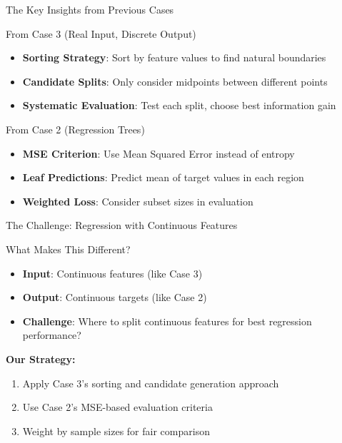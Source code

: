 \documentclass[usenames,dvipsnames]{beamer}
\begin{document}
\begin{frame}{The Key Insights from Previous Cases}
        \scriptsize

\begin{examplebox}{From Case 3 (Real Input, Discrete Output)}
        \scriptsize

\begin{itemize}
\item \textbf{Sorting Strategy}: Sort by feature values to find natural boundaries
\item \textbf{Candidate Splits}: Only consider midpoints between different points
\item \textbf{Systematic Evaluation}: Test each split, choose best information gain
\end{itemize}
\end{examplebox}

\begin{examplebox}{From Case 2 (Regression Trees)}
        \scriptsize

\begin{itemize}
\item \textbf{MSE Criterion}: Use Mean Squared Error instead of entropy
\item \textbf{Leaf Predictions}: Predict mean of target values in each region
\item \textbf{Weighted Loss}: Consider subset sizes in evaluation
\end{itemize}
\end{examplebox}
\end{frame}

\begin{frame}{The Challenge: Regression with Continuous Features}
\begin{alertbox}{What Makes This Different?}
        \scriptsize

\begin{itemize}
\item \textbf{Input}: Continuous features (like Case 3)
\item \textbf{Output}: Continuous targets (like Case 2)
\item \textbf{Challenge}: Where to split continuous features for best regression performance?
\end{itemize}
\end{alertbox}

\textbf{Our Strategy:}
\begin{enumerate}
        \scriptsize

\item Apply Case 3's sorting and candidate generation approach
\item Use Case 2's MSE-based evaluation criteria
\item Weight by sample sizes for fair comparison
\end{enumerate}
\end{frame}
\end{document}
